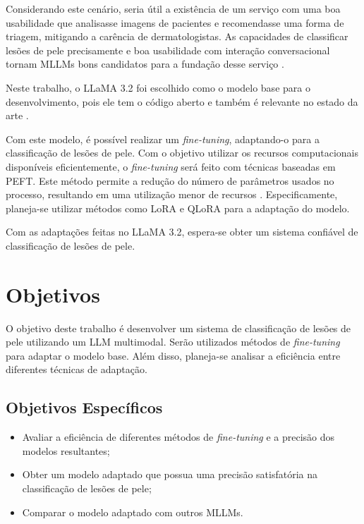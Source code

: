 Considerando este cenário, seria útil a existência de um serviço com uma boa usabilidade que analisasse imagens de pacientes e recomendasse uma forma de triagem,
mitigando a carência de dermatologistas. As capacidades de classificar lesões de pele precisamente e boa usabilidade com interação conversacional tornam \acp{MLLM}
bons candidatos para a fundação desse serviço \cite{mllm_success_rate}.

Neste trabalho, o \ac{LLaMA} 3.2 foi escolhido como o modelo base para o desenvolvimento, pois ele tem o código aberto e também é relevante no estado da arte
\cite{dubey2024llama}.


Com este modelo, é possível realizar um \textit{fine-tuning}, adaptando-o para a classificação de lesões de pele. Com o objetivo utilizar os recursos computacionais
disponíveis eficientemente, o \textit{fine-tuning} será feito com técnicas baseadas em \ac{PEFT}. Este método permite a redução do número de parâmetros usados no
processo, resultando em uma utilização menor de recursos \cite{peft}. Especificamente, planeja-se utilizar métodos como \ac{LoRA} e \ac{QLoRA} para a adaptação do modelo.

Com as adaptações feitas no \ac{LLaMA} 3.2, espera-se obter um sistema confiável de classificação de lesões de pele.

\section{Objetivos}

O objetivo deste trabalho é desenvolver um sistema de classificação de lesões de pele utilizando um \ac{LLM} multimodal. Serão utilizados métodos de \textit{fine-tuning}
para adaptar o modelo base. Além disso, planeja-se analisar a eficiência entre diferentes técnicas de adaptação.

\subsection*{Objetivos Específicos}

\begin{itemize}
    \item Avaliar a eficiência de diferentes métodos de \textit{fine-tuning} e a precisão dos modelos resultantes;
    \item Obter um modelo adaptado que possua uma precisão satisfatória na classificação de lesões de pele;
    \item Comparar o modelo adaptado com outros \acp{MLLM}.
\end{itemize}

